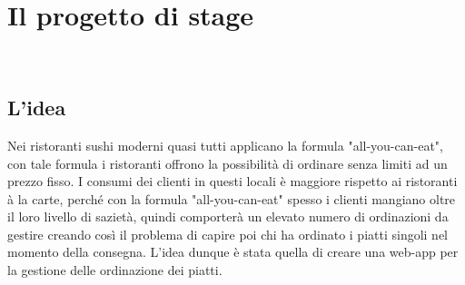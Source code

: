
\chapter{Il progetto di stage}
\label{cap:il progetto di stage}

\\

\section{L'idea}

Nei ristoranti sushi moderni quasi tutti applicano la formula "all-you-can-eat", con tale formula i ristoranti offrono la possibilità di ordinare senza limiti ad un prezzo fisso. I consumi dei clienti in questi locali è maggiore rispetto ai ristoranti à la carte, perché con la formula "all-you-can-eat" spesso i clienti mangiano oltre il loro livello di sazietà, quindi comporterà un elevato numero di ordinazioni da gestire creando così il problema di capire poi chi ha ordinato i piatti singoli nel momento della consegna. L'idea dunque è stata quella di creare una web-app per la gestione delle ordinazione dei piatti.

